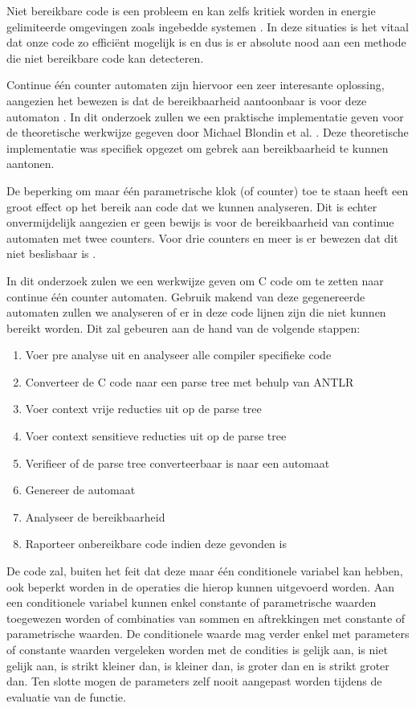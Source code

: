 \documentclass[12pt]{thesis}
\begin{document}
Niet bereikbare code is een probleem en kan zelfs kritiek worden in energie gelimiteerde omgevingen zoals ingebedde systemen \cite{embeddedefficiency}. In deze situaties is het vitaal dat onze code zo efficiënt mogelijk is en dus is er absolute nood aan een methode die niet bereikbare code kan detecteren.

Continue één counter automaten zijn hiervoor een zeer interesante oplossing, aangezien het bewezen is dat de bereikbaarheid aantoonbaar is voor deze automaton \cite{succintandparametriconecounter, danialandjoel, blondin2021continuous}. In dit onderzoek zullen we een praktische implementatie geven voor de theoretische werkwijze gegeven door Michael Blondin et al. \cite{blondin2021continuous}. Deze theoretische implementatie was specifiek opgezet om gebrek aan bereikbaarheid te kunnen aantonen.

De beperking om maar één parametrische klok (of counter) toe te staan heeft een groot effect op het bereik aan code dat we kunnen analyseren. Dit is echter onvermijdelijk aangezien er geen bewijs is voor de bereikbaarheid van continue automaten met twee counters. Voor drie counters en meer is er bewezen dat dit niet beslisbaar is \cite{FEARNLEY201526}.

In dit onderzoek zulen we een werkwijze geven om C code om te zetten naar continue één counter automaten. Gebruik makend van deze gegenereerde automaten zullen we analyseren of er in deze code lijnen zijn die niet kunnen bereikt worden. Dit zal gebeuren aan de hand van de volgende stappen:

\begin{enumerate}
	\item Voer pre analyse uit en analyseer alle compiler specifieke code
	\item Converteer de C code naar een parse tree met behulp van ANTLR
	\item Voer context vrije reducties uit op de parse tree
	\item Voer context sensitieve reducties uit op de parse tree
	\item Verifieer of de parse tree converteerbaar is naar een automaat
	\item Genereer de automaat
	\item Analyseer de bereikbaarheid
	\item Raporteer onbereikbare code indien deze gevonden is
\end{enumerate}

De code zal, buiten het feit dat deze maar één conditionele variabel kan hebben, ook beperkt worden in de operaties die hierop kunnen uitgevoerd worden. Aan een conditionele variabel kunnen enkel constante of parametrische waarden toegewezen worden of combinaties van sommen en aftrekkingen met constante of parametrische waarden. De conditionele waarde mag verder enkel met parameters of constante waarden vergeleken worden met de condities is gelijk aan, is niet gelijk aan, is strikt kleiner dan, is kleiner dan, is groter dan en is strikt groter dan. Ten slotte mogen de parameters zelf nooit aangepast worden tijdens de evaluatie van de functie.
\end{document}
